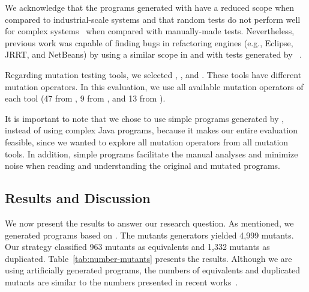 We acknowledge that the programs generated with \jdolly{} have a reduced scope when compared to industrial-scale systems and that random tests do not perform well for complex systems~\cite{ARTHO:2016:1} when compared with manually-made tests.
Nevertheless, previous work was capable of finding bugs in refactoring engines (e.g., Eclipse, JRRT, and NetBeans) by using a similar scope in \jdolly{} and with tests generated by \randoop{}~\cite{SOARES:2010:1, SOARES:2013:1, MONGIOVI:2014:1, MELINA:2017:1}.


Regarding mutation testing tools, we selected \mujava{}, \pit{}, and \major{}.
These tools have different mutation operators.
In this evaluation, we use all available mutation operators of each tool (47 from \mujava{}, 9 from \major{}, and 13 from \pit{}).


It is important to note that we chose to use simple programs generated by \jdolly{}, instead of using complex Java programs, because it makes our entire evaluation feasible, since we wanted to explore all mutation operators from all mutation tools.
In addition, simple programs facilitate the manual analyses and minimize noise when reading and understanding the original and mutated programs.

\subsection{Results and Discussion}

We now present the results to answer our research question. 
As mentioned, we generated \AnalyzedPrograms programs based on \jdolly{}. 
The mutants generators yielded 4,999 mutants. 
Our strategy classified 963 mutants as equivalents and 1,332 mutants as duplicated. 
Table~\ref{tab:number-mutants} presents the results. 
Although we are using artificially generated programs, the numbers of equivalents and duplicated mutants are similar to the numbers presented in recent works~\cite{KINTIS:2017:1, KINTIS:2016:1}.

